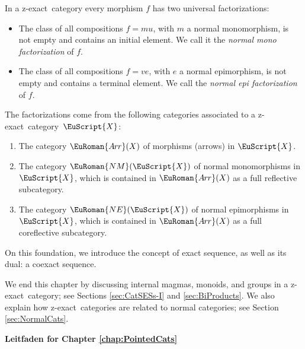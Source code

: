 \documentclass [12pt,oneside]{book}%
\theoremstyle{captionstyle}  %
\newenvironment{ulist}{			%
	\begin{itemize}}{
	\end{itemize}
}
\newcommand{\Defn}[1]{\emph{#1}}
\newcommand{\Ctgry}[1]{\EuScript{#1}}					%
\newcommand{\ZExact}{z-exact}									%
\newcommand{\ArrowCat}[1]{\EuRoman{A{\kern-0.15ex}r{\hskip-0.1ex}r}(#1)}         %
\newcommand{\NMonoCat}[1]{\EuRoman{NM}(\Ctgry{#1})}				%
\newcommand{\NEpiCat}[1]{\EuRoman{NE}(\Ctgry{#1})}				%
\begin{document}
In a \ZExact\ category every morphism $f$ has two universal factorizations:
\begin{ulist}
    \item The class of all compositions $f=mu$, with $m$ a normal monomorphism, is not empty and contains an initial element. We call it the \Defn{normal mono factorization} of $f$.
    \item The class of all compositions $f=ve$, with $e$ a normal epimorphism, is not empty and contains a terminal element. We call the \Defn{normal epi factorization } of $f$.
\end{ulist}
The factorizations come from the following categories associated to a \ZExact\ category~$\Ctgry{X}$:
\begin{enumerate}
    \item The category $\ArrowCat{X}$ of morphisms (arrows) in $\Ctgry{X}$.
    \item The category $\NMonoCat{X}$ of normal monomorphisms in $\Ctgry{X}$, which is contained in $\ArrowCat{X}$ as a full reflective subcategory.
    \item The category $\NEpiCat{X}$ of normal epimorphisms in $\Ctgry{X}$, which is contained in $\ArrowCat{X}$ as a full coreflective subcategory.
\end{enumerate}
On this foundation, we introduce the concept of exact sequence, as well as its dual: a coexact sequence.

We end this chapter by discussing internal magmas, monoids, and groups in a \ZExact\ category; see Sections \ref{sec:CatSESs-I} and \ref{sec:BiProducts}. We also explain how \ZExact\ categories are related to normal categories; see Section \ref{sec:NormalCats}.

\bigskip\bigskip

\begin{center}
    \textbf{Leitfaden for Chapter \ref{chap:PointedCats}}
\end{center}

\bigskip
\end{document}
